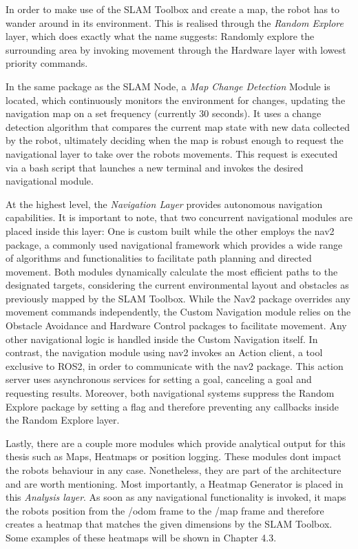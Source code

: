 \documentclass[%
paper=A4,               %
twoside=true,           %
openright,              %
11pt,                   %
bibliography=totoc,     %
titlepage=on,           %
DIV=12,                 %
BCOR=1.5cm,             %
parskip=half,            %
final
]{scrreprt}
\begin{document}
	In order to make use of the SLAM Toolbox and create a map, the robot has to wander around in its environment. This is realised through the \textit{Random Explore} layer, which does exactly what the name suggests: Randomly explore the surrounding area by invoking movement through the Hardware layer with lowest priority commands. 
	
	In the same package as the SLAM Node, a \textit{Map Change Detection} Module is located, which continuously monitors the environment for changes, updating the navigation map on a set frequency (currently 30 seconds). It uses a change detection algorithm that compares the current map state with new data collected by the robot, ultimately deciding when the map is robust enough to request the navigational layer to take over the robots movements. This request is executed via a bash script that launches a new terminal and invokes the desired navigational module.
	
	At the highest level, the \textit{Navigation Layer} provides autonomous navigation capabilities. It is important to note, that two concurrent navigational modules are placed inside this layer: One is custom built while the other employs the nav2 package, a commonly used navigational framework which provides a wide range of algorithms and functionalities to facilitate path planning and directed movement. \autocite{macenskiMarathonNavigationSystem2020} Both modules dynamically calculate the most efficient paths to the designated targets, considering the current environmental layout and obstacles as previously mapped by the SLAM Toolbox. While the Nav2 package overrides any movement commands independently, the Custom Navigation module relies on the Obstacle Avoidance and Hardware Control packages to facilitate movement. Any other navigational logic is handled inside the Custom Navigation itself. In contrast, the navigation module using nav2 invokes an Action client, a tool exclusive to ROS2, in order to communicate with the nav2 package. This action server uses asynchronous services for setting a goal, canceling a goal and requesting results. \newline
	Moreover, both navigational systems suppress the Random Explore package by setting a flag and therefore preventing any callbacks inside the Random Explore layer. 
	
	Lastly, there are a couple more modules which provide analytical output for this thesis such as Maps, Heatmaps or position logging. These modules dont impact the robots behaviour in any case. Nonetheless, they are part of the architecture and are worth mentioning. Most importantly, a Heatmap Generator is placed in this \textit{Analysis layer}. As soon as any navigational functionality is invoked, it maps the robots position from the /odom frame to the /map frame and therefore creates a heatmap that matches the given dimensions by the SLAM Toolbox. Some examples of these heatmaps will be shown in Chapter 4.3.
	
\end{document}
